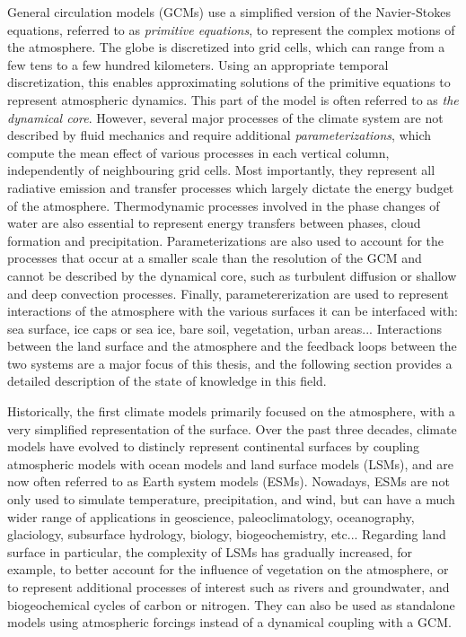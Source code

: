 General circulation models (GCMs) use a simplified version of the Navier-Stokes equations, referred to as \textit{primitive equations}, to represent the complex motions of the atmosphere. 
The globe is discretized into grid cells, which can range from a few tens to a few hundred kilometers. Using an appropriate temporal discretization, this enables approximating solutions of the primitive equations to represent atmospheric dynamics. This part of the model is often referred to as \textit{the dynamical core}. However, several major processes of the climate system are not described by fluid mechanics and require additional \textit{parameterizations}, which compute the mean effect of various processes in each vertical column, independently of neighbouring grid cells. Most importantly, they represent all radiative emission and transfer processes which largely dictate the energy budget of the atmosphere.
Thermodynamic processes involved in the phase changes of water are also essential to represent energy transfers between phases, cloud formation and precipitation. Parameterizations are also used to account for the processes that occur at a smaller scale than the resolution of the GCM and cannot be described by the dynamical core, such as turbulent diffusion or shallow and deep convection processes. Finally, parametererization are used to represent interactions of the atmosphere with the various surfaces it can be interfaced with: sea surface, ice caps or sea ice, bare soil, vegetation, urban areas... Interactions between the land surface and the atmosphere and the feedback loops between the two systems are a major focus of this thesis, and the following section %
provides a detailed description of the state of knowledge in this field. 

Historically, the first climate models primarily focused on the atmosphere, with
a very simplified representation of the surface. Over the past three decades, climate models have evolved to distincly represent continental surfaces by coupling atmospheric models with ocean models and land surface models (LSMs), and are now often referred to as Earth system models (ESMs). Nowadays, ESMs are not only used to simulate temperature, precipitation, and wind, but can have a much wider range of applications in geoscience, paleoclimatology, oceanography, glaciology, subsurface hydrology, biology, biogeochemistry, etc... 
Regarding land surface in particular, the complexity of LSMs has gradually increased, for example, to better account for the influence of vegetation on the atmosphere, or to represent additional processes of interest such as rivers and groundwater, and biogeochemical cycles of carbon or nitrogen. They can also be used as standalone models using atmospheric forcings instead of a dynamical coupling with a GCM.

